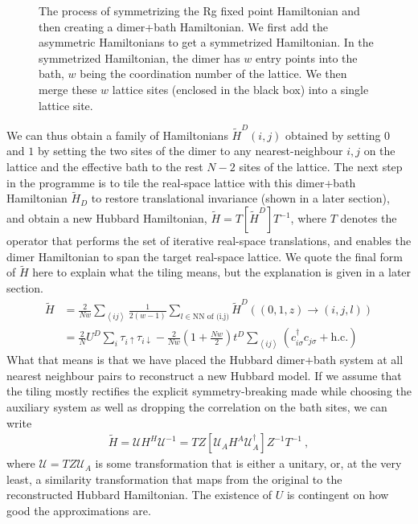 \documentclass{report}
\numberwithin{equation}{section}
\begin{document}
{\begin{figure}[!htb]
 	\caption{The process of symmetrizing the Rg fixed point Hamiltonian and then creating a dimer+bath Hamiltonian. We first add the asymmetric Hamiltonians to get a symmetrized Hamiltonian. In the symmetrized Hamiltonian, the dimer has \(w\) entry points into the bath, \(w\) being the coordination number of the lattice. We then merge these \(w\) lattice sites (enclosed in the black box) into a single lattice site.}
 	\label{dimer-bath} 
 \end{figure}
 We  can thus obtain a family of Hamiltonians \(\tilde H^D(i,j)\) obtained by setting \(0\) and \(1\) by setting the two sites of the dimer to any nearest-neighbour \(i,j\) on the lattice and the effective bath to the rest \(N-2\) sites of the lattice. The next step in the programme is to tile the real-space lattice with this dimer+bath Hamiltonian \(\tilde H_D\) to restore translational invariance (shown in a later section), and obtain a new Hubbard Hamiltonian, $\tilde H = T\left[ \tilde H^{D} \right] T^{-1}$, where $T$ denotes the operator that performs the set of iterative real-space translations, and enables the dimer Hamiltonian to span the target real-space lattice. We quote the final form of $\tilde H$ here to explain what the tiling means, but the explanation is given in a later section.
 \begin{equation}\begin{aligned}
 	\tilde H &= \frac{2}{Nw}\sum_{\left<ij\right>}\frac{1}{2(w-1)}\sum_{l \in \text{NN of (i,j)}}\tilde H^D((0,1,z) \to (i, j, l))\\
 		 &= \frac{2}{N}U^D\sum_{i} \tau_{i \uparrow}\tau_{i \downarrow} - \frac{2}{Nw}\left(1 + \frac{Nw}{2}\right)t^D\sum_{\left<ij\right>}\left(c^\dagger_{i\sigma}c_{j\sigma} + \text{h.c.}\right)
 \end{aligned}\end{equation}
 What that means is that we have placed the Hubbard dimer+bath system at all nearest neighbour pairs to reconstruct a new Hubbard model. If we assume that the tiling mostly rectifies the explicit symmetry-breaking made while choosing the auxiliary system as well as dropping the correlation on the bath sites, we can write
 \begin{equation}\begin{aligned}
 	\tilde H = \mathcal{U} H^H \mathcal{U}^{-1} = TZ\left[\mathcal{U}_A H^A \mathcal{U}_A^\dagger \right]Z^{-1} T^{-1}~,
 \end{aligned}\end{equation}
 where $\mathcal{U} = TZ\mathcal{U}_{A}$ is some transformation that is either a unitary, or, at the very least, a similarity transformation that maps from the original to the reconstructed Hubbard Hamiltonian. 
 The existence of $U$ is contingent on how good the approximations are.
 
}
\end{document}
